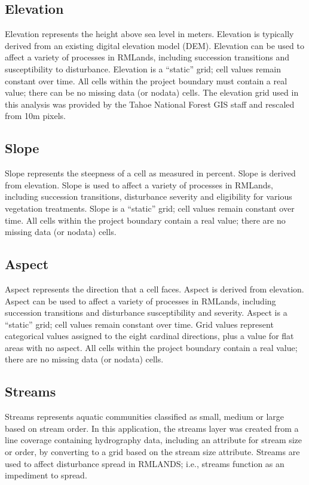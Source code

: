 \subsection{Elevation} 
Elevation represents the height above sea level in meters. Elevation is typically derived from an existing digital elevation model (DEM). Elevation can be used to affect a variety of processes in RMLands, including succession transitions and susceptibility to disturbance. Elevation is a ``static'' grid; cell values remain constant over time. All cells within the project boundary must contain a real value; there can be no missing data (or nodata) cells. The elevation grid used in this analysis was provided by the Tahoe National Forest GIS staff and rescaled from 10m pixels.

\subsection{Slope} 
Slope represents the steepness of a cell as measured in percent. Slope is derived from elevation. Slope is used to affect a variety of processes in RMLands, including succession transitions, disturbance severity and eligibility for various vegetation treatments. Slope is a ``static'' grid; cell values remain constant over time. All cells within the project boundary contain a real value; there are no missing data (or nodata) cells. 

\subsection{Aspect} Aspect represents the direction that a cell faces. Aspect is derived from elevation. Aspect can be used to affect a variety of processes in RMLands, including succession transitions and disturbance susceptibility and severity. Aspect is a ``static'' grid; cell values remain constant over time. Grid values represent categorical values assigned to the eight cardinal directions, plus a value for flat areas with no aspect. All cells within the project boundary  contain a real value; there are no missing data (or nodata) cells. 

\subsection{Streams} 
Streams represents aquatic communities classified as small, medium or large based on
stream order. In this application, the streams layer was created from a line coverage containing hydrography data, including an attribute for stream size or order, by converting to a grid based on the stream size attribute. Streams are used to affect disturbance spread in RMLANDS; i.e., streams function as an impediment to spread. 

